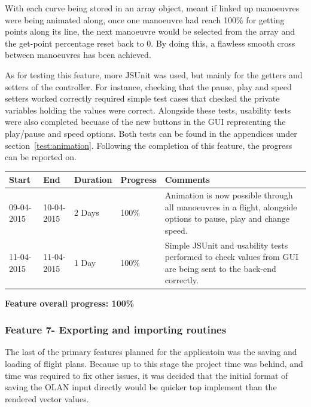 With each curve being stored in an array object, meant if linked up manoeuvres were being animated along, once one manoeuvre had reach 100\% for getting points along its line, the next manoeuvre would be selected from the array and the get-point percentage reset back to 0. By doing this, a flawless smooth cross between manoeuvres has been achieved.

As for testing this feature, more JSUnit was used, but mainly for the getters and setters of the controller. For instance, checking that the pause, play and speed setters worked correctly required simple test cases that checked the private variables holding the values were correct. Alongside these tests, usability tests were also completed becuase of the new buttons in the GUI representing the play/pause and speed options. Both tests can be found in the appendices under section~\ref{test:animation}. Following the completion of this feature, the progress can be reported on. 

\begin{table}[h]
\begin{tabular}{|l|l|l|l|p{7cm}|}
\hline
\textbf{Start} & \textbf{End} & \textbf{Duration} & \textbf{Progress} & \textbf{Comments}                                                                                                     \\ \hline
09-04-2015     & 10-04-2015   & 2 Days            & 100\%             &  Animation is now possible through all manoeuvres in a flight, alongside options to pause, play and change speed.\\ \hline
11-04-2015     & 11-04-2015   & 1 Day            & 100\%             &  Simple JSUnit and usability tests performed to check values from GUI are being sent to the back-end correctly.\\ \hline
\end{tabular}
\end{table}

\textbf{Feature overall progress: 100\%}

\subsubsection{Feature 7- Exporting and importing routines}
The last of the primary features planned for the applicatoin was the saving and loading of flight plans. Because up to this stage the project time was behind, and time was required to fix other issues, it was decided that the initial format of saving the OLAN input directly would be quicker top implement than the rendered vector values. 

